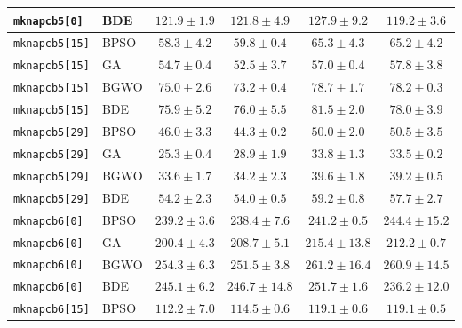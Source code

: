 \documentclass[journal,article,submit,moreauthors]{Definitions/mdpi}
\begin{document}
\begin{longtable}{llcccc}
    \texttt{mknapcb5[0]} & BDE   &          $121.9 \pm 1.9$ &          $121.8 \pm 4.9$ &          $127.9 \pm 9.2$ & $\mathbf{119.2 \pm 3.6}$ \\
    \midrule
    \texttt{mknapcb5[15]} & BPSO  &  $\mathbf{58.3 \pm 4.2}$ &           $59.8 \pm 0.4$ &           $65.3 \pm 4.3$ &           $65.2 \pm 4.2$ \\
    \texttt{mknapcb5[15]} & GA    &           $54.7 \pm 0.4$ &  $\mathbf{52.5 \pm 3.7}$ &           $57.0 \pm 0.4$ &           $57.8 \pm 3.8$ \\
    \texttt{mknapcb5[15]} & BGWO  &           $75.0 \pm 2.6$ &  $\mathbf{73.2 \pm 0.4}$ &           $78.7 \pm 1.7$ &           $78.2 \pm 0.3$ \\
    \texttt{mknapcb5[15]} & BDE   &  $\mathbf{75.9 \pm 5.2}$ &           $76.0 \pm 5.5$ &           $81.5 \pm 2.0$ &           $78.0 \pm 3.9$ \\
    \midrule
    \texttt{mknapcb5[29]} & BPSO  &           $46.0 \pm 3.3$ &  $\mathbf{44.3 \pm 0.2}$ &           $50.0 \pm 2.0$ &           $50.5 \pm 3.5$ \\
    \texttt{mknapcb5[29]} & GA    &  $\mathbf{25.3 \pm 0.4}$ &           $28.9 \pm 1.9$ &           $33.8 \pm 1.3$ &           $33.5 \pm 0.2$ \\
    \texttt{mknapcb5[29]} & BGWO  &  $\mathbf{33.6 \pm 1.7}$ &           $34.2 \pm 2.3$ &           $39.6 \pm 1.8$ &           $39.2 \pm 0.5$ \\
    \texttt{mknapcb5[29]} & BDE   &           $54.2 \pm 2.3$ &  $\mathbf{54.0 \pm 0.5}$ &           $59.2 \pm 0.8$ &           $57.7 \pm 2.7$ \\
    \midrule
    \texttt{mknapcb6[0]} & BPSO  &          $239.2 \pm 3.6$ & $\mathbf{238.4 \pm 7.6}$ &          $241.2 \pm 0.5$ &         $244.4 \pm 15.2$ \\
    \texttt{mknapcb6[0]} & GA    & $\mathbf{200.4 \pm 4.3}$ &          $208.7 \pm 5.1$ &         $215.4 \pm 13.8$ &          $212.2 \pm 0.7$ \\
    \texttt{mknapcb6[0]} & BGWO  &          $254.3 \pm 6.3$ & $\mathbf{251.5 \pm 3.8}$ &         $261.2 \pm 16.4$ &         $260.9 \pm 14.5$ \\
    \texttt{mknapcb6[0]} & BDE   &          $245.1 \pm 6.2$ &         $246.7 \pm 14.8$ &          $251.7 \pm 1.6$ & $\mathbf{236.2 \pm 12.0}$ \\
    \midrule
    \texttt{mknapcb6[15]} & BPSO  & $\mathbf{112.2 \pm 7.0}$ &          $114.5 \pm 0.6$ &          $119.1 \pm 0.6$ &          $119.1 \pm 0.5$ \\

\end{longtable}
\end{document}
